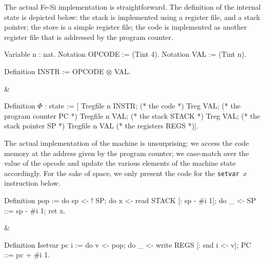 \documentclass{llncs}
\begin{document}
The actual Fe-Si implementation is straightforward. The definition of
the internal state is depicted below: the stack is implemented using a
register file, and a stack pointer; the store is a simple register
file; the code is implemented as another register file that is
addressed by the program counter.

\begin{twolistings}
\begin{coq}
Variable n : nat. 
Notation OPCODE := (Tint 4).  
Notation VAL := (Tint n). 

Definition INSTR := OPCODE $\otimes$ VAL.  
$ $
\end{coq}
&
\begin{coq}
Definition $\Phi$ : state := [
Tregfile n INSTR;       (* the code *)
Treg VAL;               (* the program counter PC *)
Tregfile n VAL;         (* the stack STACK *)
Treg VAL;               (* the stack pointer SP  *)
Tregfile n VAL          (* the registers REGS *)]. 
\end{coq}
\end{twolistings}

The actual implementation of the machine is unsurprising: we access
the code memory at the address given by the program counter; we
case-match over the value of the opcode and update the various
elements of the machine state accordingly. 
%
For the sake of space, we only present the code for the \texttt{setvar
  $x$} instruction below.

\begin{twolistings}
\begin{coq}
Definition pop :=
do sp <- ! SP;       
do x <- read STACK [: sp - #i 1];
do _ <- SP ::= sp - #i 1;
ret x.    
\end{coq}
&
\begin{coq}
Definition Isetvar pc i := 
do v <- pop; 
do _ <- write REGS [: snd i <- v];
PC ::= pc + #i 1.
$ $
\end{coq}
\end{twolistings}
\end{document}
